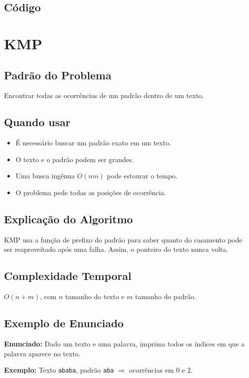 \subsection{Código}

\section{KMP}

\subsection{Padrão do Problema}
Encontrar todas as ocorrências de um padrão dentro de um texto.

\subsection{Quando usar}
\begin{itemize}[nosep]
  \item É necessário buscar um padrão exato em um texto.
  \item O texto e o padrão podem ser grandes.
  \item Uma busca ingênua $O(nm)$ pode estourar o tempo.
  \item O problema pede todas as posições de ocorrência.
\end{itemize}

\subsection{Explicação do Algoritmo}
KMP usa a função de prefixo do padrão para saber quanto do casamento pode ser reaproveitado após uma falha. Assim, o ponteiro do texto nunca volta.

\subsection{Complexidade Temporal}
$O(n + m)$, com $n$ tamanho do texto e $m$ tamanho do padrão.

\subsection{Exemplo de Enunciado}
\begin{exemplodiabox}
\textbf{Enunciado:} Dado um texto e uma palavra, imprima todos os índices em que a palavra aparece no texto.

\textbf{Exemplo:} Texto \texttt{ababa}, padrão \texttt{aba} $\Rightarrow$ ocorrências em $0$ e $2$.
\end{exemplodiabox}

